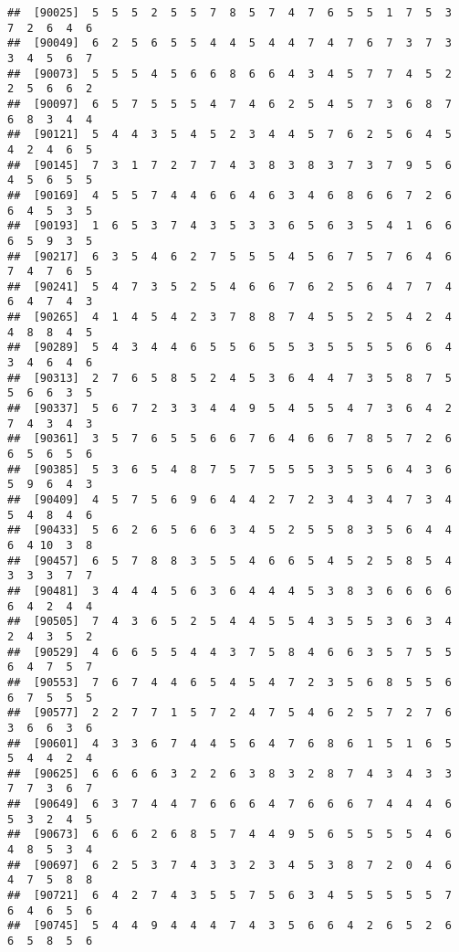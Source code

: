 \documentclass[
]{book}
\begin{document}
\begin{verbatim}
##  [90025]  5  5  5  2  5  5  7  8  5  7  4  7  6  5  5  1  7  5  3  7  2  6  4  6
##  [90049]  6  2  5  6  5  5  4  4  5  4  4  7  4  7  6  7  3  7  3  3  4  5  6  7
##  [90073]  5  5  5  4  5  6  6  8  6  6  4  3  4  5  7  7  4  5  2  2  5  6  6  2
##  [90097]  6  5  7  5  5  5  4  7  4  6  2  5  4  5  7  3  6  8  7  6  8  3  4  4
##  [90121]  5  4  4  3  5  4  5  2  3  4  4  5  7  6  2  5  6  4  5  4  2  4  6  5
##  [90145]  7  3  1  7  2  7  7  4  3  8  3  8  3  7  3  7  9  5  6  4  5  6  5  5
##  [90169]  4  5  5  7  4  4  6  6  4  6  3  4  6  8  6  6  7  2  6  6  4  5  3  5
##  [90193]  1  6  5  3  7  4  3  5  3  3  6  5  6  3  5  4  1  6  6  6  5  9  3  5
##  [90217]  6  3  5  4  6  2  7  5  5  5  4  5  6  7  5  7  6  4  6  7  4  7  6  5
##  [90241]  5  4  7  3  5  2  5  4  6  6  7  6  2  5  6  4  7  7  4  6  4  7  4  3
##  [90265]  4  1  4  5  4  2  3  7  8  8  7  4  5  5  2  5  4  2  4  4  8  8  4  5
##  [90289]  5  4  3  4  4  6  5  5  6  5  5  3  5  5  5  5  6  6  4  3  4  6  4  6
##  [90313]  2  7  6  5  8  5  2  4  5  3  6  4  4  7  3  5  8  7  5  5  6  6  3  5
##  [90337]  5  6  7  2  3  3  4  4  9  5  4  5  5  4  7  3  6  4  2  7  4  3  4  3
##  [90361]  3  5  7  6  5  5  6  6  7  6  4  6  6  7  8  5  7  2  6  6  5  6  5  6
##  [90385]  5  3  6  5  4  8  7  5  7  5  5  5  3  5  5  6  4  3  6  5  9  6  4  3
##  [90409]  4  5  7  5  6  9  6  4  4  2  7  2  3  4  3  4  7  3  4  5  4  8  4  6
##  [90433]  5  6  2  6  5  6  6  3  4  5  2  5  5  8  3  5  6  4  4  6  4 10  3  8
##  [90457]  6  5  7  8  8  3  5  5  4  6  6  5  4  5  2  5  8  5  4  3  3  3  7  7
##  [90481]  3  4  4  4  5  6  3  6  4  4  4  5  3  8  3  6  6  6  6  6  4  2  4  4
##  [90505]  7  4  3  6  5  2  5  4  4  5  5  4  3  5  5  3  6  3  4  2  4  3  5  2
##  [90529]  4  6  6  5  5  4  4  3  7  5  8  4  6  6  3  5  7  5  5  6  4  7  5  7
##  [90553]  7  6  7  4  4  6  5  4  5  4  7  2  3  5  6  8  5  5  6  6  7  5  5  5
##  [90577]  2  2  7  7  1  5  7  2  4  7  5  4  6  2  5  7  2  7  6  3  6  6  3  6
##  [90601]  4  3  3  6  7  4  4  5  6  4  7  6  8  6  1  5  1  6  5  5  4  4  2  4
##  [90625]  6  6  6  6  3  2  2  6  3  8  3  2  8  7  4  3  4  3  3  7  7  3  6  7
##  [90649]  6  3  7  4  4  7  6  6  6  4  7  6  6  6  7  4  4  4  6  5  3  2  4  5
##  [90673]  6  6  6  2  6  8  5  7  4  4  9  5  6  5  5  5  5  4  6  4  8  5  3  4
##  [90697]  6  2  5  3  7  4  3  3  2  3  4  5  3  8  7  2  0  4  6  4  7  5  8  8
##  [90721]  6  4  2  7  4  3  5  5  7  5  6  3  4  5  5  5  5  5  7  6  4  6  5  6
##  [90745]  5  4  4  9  4  4  4  7  4  3  5  6  6  4  2  6  5  2  6  6  5  8  5  6

\end{verbatim}
\end{document}
